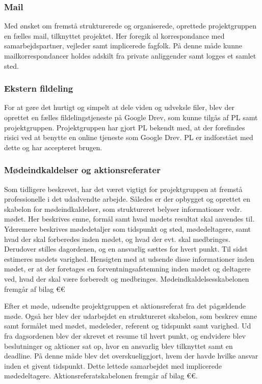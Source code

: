 	\subsubsection{Mail}
	Med ønsket om fremstå strukturerede og organiserede, oprettede projektgruppen en fælles mail, tilknyttet projektet. Her foregik al korrespondance med samarbejdspartner, vejleder samt implicerede fagfolk. På denne måde kunne mailkorrespondancer holdes adskilt fra private anliggender samt logges et samlet sted. 
	\subsubsection{Ekstern fildeling}
	For at gøre det hurtigt og simpelt at dele viden og udveksle filer, blev der oprettet en fælles fildelingstjeneste på Google Drev, som kunne tilgås af PL samt projektgruppen.  
	Projektgruppen har gjort PL bekendt med, at der forefindes risici ved at benytte en online tjeneste som Google Drev. PL er indforstået med dette og har accepteret brugen. 
	\subsubsection{Mødeindkaldelser og aktionsreferater}
	Som tidligere beskrevet, har det været vigtigt for projektgruppen at fremstå professionelle i det udadvendte arbejde. Således er der opbygget og oprettet en skabelon for mødeindkaldelser, som struktureret belyser informationer vedr. mødet. Her beskrives emne, formål samt hvad mødets resultat skal anvendes til. Yderemere beskrives mødedetaljer som tidspunkt og sted, mødedeltagere, samt hvad der skal forberedes inden mødet, og hvad der evt. skal medbringes. Derudover stilles dagordenen, og en ansvarlig sættes for hvert punkt. Til sidst estimeres mødets varighed. Hensigten med at udsende disse informationer inden mødet, er at der foretages en forventningsafstemning inden mødet og deltagere ved, hvad der skal være forberedt og medbringes. Mødeindkaldelsesskabelonen fremgår af bilag €€ 
	
	Efter et møde, udsendte projektgruppen et aktionsreferat fra det pågældende møde. Også her blev der udarbejdet en struktureret skabelon, som beskrev emne samt formålet med mødet, mødeleder, referent og tidspunkt samt varighed. Ud fra dagsordenen blev der skrevet et resume til hvert punkt, og endvidere blev beslutninger og aktioner sat op, hvor en ansvarlig blev tilknyttet samt en deadline. På denne måde blev det overskueliggjort, hvem der havde hvilke ansvar inden et givent tidspunkt. Dette lettede samarbejdet med implicerede mødedeltagere. Aktionsreferatskabelonen fremgår af bilag €€.     
	
